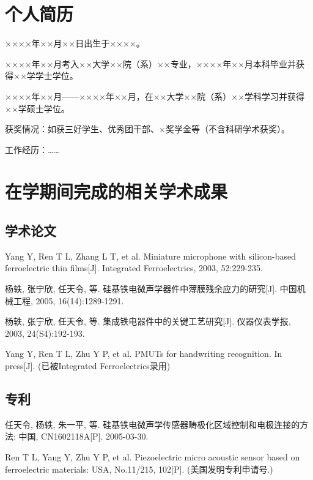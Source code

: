 
\begin{resume}

  \section*{个人简历}

  ××××年××月××日出生于××××。

  ××××年××月考入××大学××院（系）××专业，××××年××月本科毕业并获得××学学士学位。

  ××××年××月——××××年××月，在××大学××院（系）××学科学习并获得××学硕士学位。

  获奖情况：如获三好学生、优秀团干部、×奖学金等（不含科研学术获奖）。

  工作经历：……

  \section*{在学期间完成的相关学术成果}

  \subsection{学术论文}

  \begin{achievements}
    \item Yang Y, Ren T L, Zhang L T, et al. Miniature microphone with silicon-based ferroelectric thin films[J]. Integrated Ferroelectrics, 2003, 52:229-235.
    \item 杨轶, 张宁欣, 任天令, 等. 硅基铁电微声学器件中薄膜残余应力的研究[J]. 中国机械工程, 2005, 16(14):1289-1291.
    \item 杨轶, 张宁欣, 任天令, 等. 集成铁电器件中的关键工艺研究[J]. 仪器仪表学报, 2003, 24(S4):192-193.
    \item Yang Y, Ren T L, Zhu Y P, et al. PMUTs for handwriting recognition. In press[J]. (已被Integrated Ferroelectrics录用)
  \end{achievements}


  \subsection{专利}

  \begin{achievements}
    \item 任天令, 杨轶, 朱一平, 等. 硅基铁电微声学传感器畴极化区域控制和电极连接的方法: 中国, CN1602118A[P]. 2005-03-30.
    \item Ren T L, Yang Y, Zhu Y P, et al. Piezoelectric micro acoustic sensor based on ferroelectric materials: USA, No.11/215, 102[P]. (美国发明专利申请号.)
  \end{achievements}

\end{resume}

